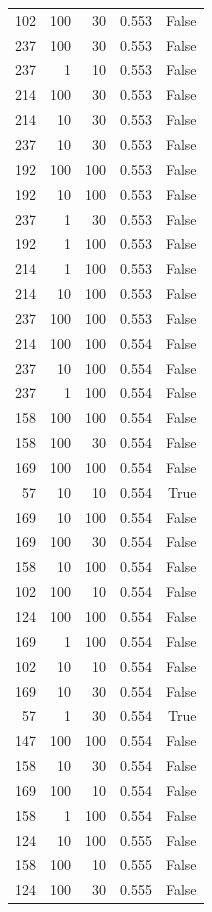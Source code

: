 \begin{tabular}{rrrrr}
102 & 100 & 30 & 0.553 & False \\
237 & 100 & 30 & 0.553 & False \\
237 & 1 & 10 & 0.553 & False \\
214 & 100 & 30 & 0.553 & False \\
214 & 10 & 30 & 0.553 & False \\
237 & 10 & 30 & 0.553 & False \\
192 & 100 & 100 & 0.553 & False \\
192 & 10 & 100 & 0.553 & False \\
237 & 1 & 30 & 0.553 & False \\
192 & 1 & 100 & 0.553 & False \\
214 & 1 & 100 & 0.553 & False \\
214 & 10 & 100 & 0.553 & False \\
237 & 100 & 100 & 0.553 & False \\
214 & 100 & 100 & 0.554 & False \\
237 & 10 & 100 & 0.554 & False \\
237 & 1 & 100 & 0.554 & False \\
158 & 100 & 100 & 0.554 & False \\
158 & 100 & 30 & 0.554 & False \\
169 & 100 & 100 & 0.554 & False \\
57 & 10 & 10 & 0.554 & True \\
169 & 10 & 100 & 0.554 & False \\
169 & 100 & 30 & 0.554 & False \\
158 & 10 & 100 & 0.554 & False \\
102 & 100 & 10 & 0.554 & False \\
124 & 100 & 100 & 0.554 & False \\
169 & 1 & 100 & 0.554 & False \\
102 & 10 & 10 & 0.554 & False \\
169 & 10 & 30 & 0.554 & False \\
57 & 1 & 30 & 0.554 & True \\
147 & 100 & 100 & 0.554 & False \\
158 & 10 & 30 & 0.554 & False \\
169 & 100 & 10 & 0.554 & False \\
158 & 1 & 100 & 0.554 & False \\
124 & 10 & 100 & 0.555 & False \\
158 & 100 & 10 & 0.555 & False \\
124 & 100 & 30 & 0.555 & False \\

\end{tabular}
